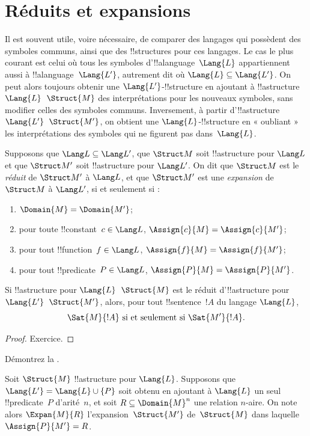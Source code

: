 \documentclass[../../../include/open-logic-section]{subfiles}
\begin{document}
\section{Réduits et expansions}

Il est souvent utile, voire nécessaire, de comparer des langages qui
possèdent des symboles communs, ainsi que des !!{structure}s pour ces
langages. Le cas le plus courant est celui où tous les symboles
d'!!a{language}~$\Lang{L}$ appartiennent aussi à !!a{language}~$\Lang{L'}$,
autrement dit où $\Lang{L} \subseteq \Lang{L'}$. On peut alors toujours
obtenir une $\Lang{L'}$-!!{structure} en ajoutant à !!a{structure}
$\Lang{L}$~$\Struct{M}$ des interprétations pour les nouveaux symboles,
sans modifier celles des symboles communs. Inversement, à partir
d'!!a{structure} $\Lang{L'}$~$\Struct{M'}$, on obtient une
$\Lang{L}$-!!{structure} en « oubliant » les interprétations des symboles
qui ne figurent pas dans~$\Lang{L}$.

\begin{defn}
Supposons que $\Lang L \subseteq \Lang L'$, que $\Struct M$ soit
!!a{structure} pour $\Lang L$ et que $\Struct M'$ soit !!a{structure}
pour $\Lang L'$. On dit que $\Struct M$ est le \emph{réduit} de
$\Struct M'$ à $\Lang L$, et que $\Struct M'$ est une \emph{expansion}
de $\Struct M$ à $\Lang L'$, si et seulement si :
\begin{enumerate}
\item $\Domain{M} = \Domain{M'}$;
\item pour toute !!{constant}~$c \in \Lang L$, $\Assign{c}{M} =
  \Assign{c}{M'}$;
\item pour tout !!{function}~$f \in \Lang L$, $\Assign{f}{M} =
  \Assign{f}{M'}$;
\item pour tout !!{predicate}~$P \in \Lang L$, $\Assign{P}{M} =
  \Assign{P}{M'}$.
\end{enumerate}
\end{defn}

\begin{prop}
Si !!a{structure} pour $\Lang{L}$~$\Struct{M}$ est le réduit
d'!!a{structure} pour $\Lang{L'}$~$\Struct{M'}$, alors, pour tout
!!{sentence}~$!A$ du langage $\Lang{L}$,
\[
\Sat{M}{!A} \text{ si et seulement si } \Sat{M'}{!A}.
\]
\end{prop}

\begin{proof}
  Exercice.
\end{proof}

\begin{prob}
Démontrez la .
\end{prob}

\begin{defn}
Soit $\Struct{M}$ !!a{structure} pour $\Lang{L}$. Supposons que
$\Lang{L'} = \Lang{L} \cup \{P\}$ soit obtenu en ajoutant à $\Lang{L}$
un seul !!{predicate}~$P$ d'arité~$n$, et soit
$R \subseteq \Domain{M}^n$ une relation $n$-aire. On note alors
$\Expan{M}{R}$ l'expansion~$\Struct{M'}$ de~$\Struct{M}$ dans laquelle
$\Assign{P}{M'} = R$.
\end{defn}
\end{document}
